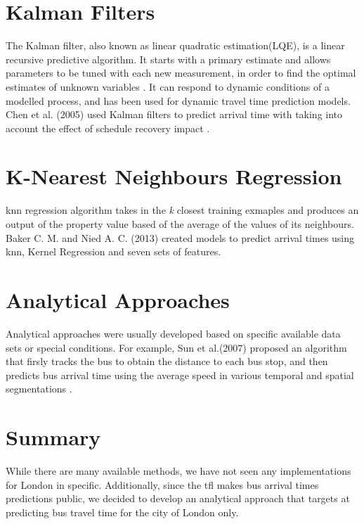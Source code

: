 \section{Kalman Filters}
\par The Kalman filter, also known as linear quadratic estimation(LQE), is a linear recursive predictive algorithm. It starts with a primary estimate and allows parameters to be tuned with each new measurement, in order to find the optimal estimates of unknown variables \cite{kalman_filters}. It can respond to dynamic conditions of a modelled process, and has been used for dynamic travel time prediction models. Chen et al. (2005) used Kalman filters to predict arrival time with taking into account the effect of schedule recovery impact \cite{kalman_dynamic_schedule}.

\section{K-Nearest Neighbours Regression}
\par \acrfull{knn} regression algorithm takes in the \textit{k} closest training exmaples and produces an output of the property value based of the average of the values of its neighbours. Baker C. M. and Nied A. C. (2013) created models to predict arrival times using \acrshort{knn}, Kernel Regression and seven sets of features\cite{knn_one_bus_away}.

\section{Analytical Approaches}
\par Analytical approaches were usually developed based on specific available data sets or special conditions. For example, Sun et al.(2007) proposed an algorithm that firsly tracks the bus to obtain the distance to each bus stop, and then predicts bus arrival time using the average speed in various temporal and spatial segmentations \cite{analytical_approach}.

\section{Summary}
\par While there are many available methods, we have not seen any implementations for London in specific. Additionally, since the \acrshort{tfl} makes bus arrival times predictions public, we decided to develop an analytical approach that targets at predicting bus travel time for the city of London only.
